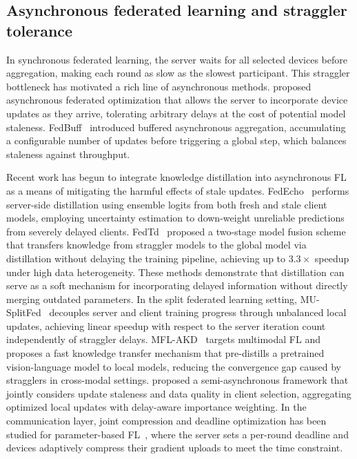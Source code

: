 \documentclass[a4paper,fleqn]{cas-dc}
\begin{document}
	\subsection{Asynchronous federated learning and straggler tolerance}\label{sec:rw_async}
	
	In synchronous federated learning, the server waits for all selected
	devices before aggregation, making each round as slow as the slowest
	participant. This straggler bottleneck has motivated a rich line of
	asynchronous methods. \citet{xie_async_fedopt_2019}
	proposed asynchronous federated optimization that allows the server to
	incorporate device updates as they arrive, tolerating arbitrary delays
	at the cost of potential model staleness.
	FedBuff~\citep{nguyen_fedbuff_2022} introduced buffered asynchronous
	aggregation, accumulating a configurable number of updates before
	triggering a global step, which balances staleness against throughput.
	
	Recent work has begun to integrate knowledge distillation into
	asynchronous FL as a means of mitigating the harmful effects of stale
	updates. FedEcho~\citep{wang_fedecho_2025} performs server-side
	distillation using ensemble logits from both fresh and stale client
	models, employing uncertainty estimation to down-weight unreliable
	predictions from severely delayed clients.
	FedTd~\citep{xu_fedtd_2025} proposed a two-stage model fusion scheme
	that transfers knowledge from straggler models to the global model
	via distillation without delaying the training pipeline, achieving
	up to $3.3\times$ speedup under high data heterogeneity. These
	methods demonstrate that distillation can serve as a soft mechanism
	for incorporating delayed information without directly merging
	outdated parameters. In the split federated learning
	setting, MU-SplitFed~\citep{li_mu_splitfed_2025} decouples server and
	client training progress through unbalanced local updates, achieving
	linear speedup with respect to the server iteration count
	independently of straggler delays. MFL-AKD~\citep{tang_mfl_akd_2024}
	targets multimodal FL and proposes a fast knowledge transfer mechanism
	that pre-distills a pretrained vision-language model to local models,
	reducing the convergence gap caused by stragglers in cross-modal
	settings. \citet{wang_faga2_2025} proposed a
	semi-asynchronous framework that jointly considers update staleness
	and data quality in client selection, aggregating optimized local
	updates with delay-aware importance weighting. In the communication
	layer, joint compression and deadline optimization has been studied
	for parameter-based FL~\citep{chen_joint_deadline_2023}, where the
	server sets a per-round deadline and devices adaptively compress their
	gradient uploads to meet the time constraint.
	
\end{document}
